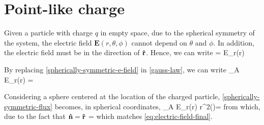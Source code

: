 \section{Point-like charge}
Given a particle with charge $q$ in empty space, due to the spherical symmetry of the system, the electric field $\mathbf{E}(r,\theta,\phi)$ 
cannot depend on $\theta$ and $\phi$. In addition, the electric field must be in the direction of $\boldsymbol{\hat{\textbf{$\mathrm r$}}}$. Hence, we can write
\be\label{spherically-symmetric-e-field}
 = E_r(r) 
\ee

By replacing \ref{spherically-symmetric-e-field} in \ref{gauss-law}, we can write
\be\label{spherically-symmetric-flux}
\oiint_A E_r(r)  \cdot {} =
\ee

Considering a sphere centered at the location of the charged particle, \ref{spherically-symmetric-flux} becomes, in spherical coordinates,
\be\label{spherically-symmetric-flux-2}
\oiint_A E_r(r)  \cdot {}r^{2}\sin(\phi)\theta{}\phi =
\ee
from which, due to the fact that $\boldsymbol{\hat{\textbf{$\mathrm n$}}}=\boldsymbol{\hat{\textbf{$\mathrm r$}}}$
\be
{}=
\ee
which matches \ref{eq:electric-field-final}.
